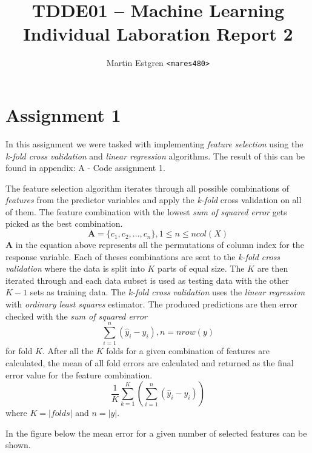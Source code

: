 \documentclass[a4paper,12pt]{article}
\title{TDDE01 -- Machine Learning \\
       Individual Laboration Report 2}
\author{Martin Estgren \texttt{<mares480>}}
\begin{document}
    \maketitle %
\section{Assignment 1}

In this assignment we were tasked with implementing \textit{feature selection} using the \textit{k-fold cross validation} and \textit{linear regression} algorithms. The result of this can be found in appendix: A - Code assignment 1. 

The feature selection algorithm iterates through all possible combinations of \textit{features} from the predictor variables and apply the \textit{k-fold} cross validation on all of them. The feature combination with the lowest \textit{sum of squared error} gets picked as the best combination. 
\begin{equation}
  \mathbf{A} = \{c_1,c_2,...,c_n\}, 1 \le n \le ncol(X)
\end{equation} 
\( \mathbf{A} \) in the equation above represents all the permutations of column index for the response variable. Each of theses combinations are sent to the \textit{k-fold cross validation} where the data is split into  \( \mathit{K} \)  parts of equal size. The  \( \mathit{K} \) are then iterated through and each data subset is used as testing data with the other \( \mathit{K} -1 \) sets as training data. The \textit{k-fold cross validation} uses the \textit{linear regression} with \textit{ordinary least squares} estimator.  The produced predictions are then error checked with the \textit{sum of squared error} 
\begin{equation}
  \sum _{i = 1} ^{n} (\hat{y}_i - y_i), n = nrow(y)
\end{equation} 
for fold \( \mathit{K} \). After all the \( \mathit{K} \) folds for a given combination of features are calculated, the mean of all fold errors are calculated and returned as the final error value for the feature combination.
\begin{equation}
\frac{1}{\mathit{K}}\sum_{k = 1}^{\mathit{K}} ( \sum _{i = 1} ^{n} (\hat{y}_i - y_i))
\end{equation} 
where \( \mathit{K} = |folds|\) and \(n = |y|\).

In the figure below the mean error for a given number of selected features can be shown. 
\end{document}
